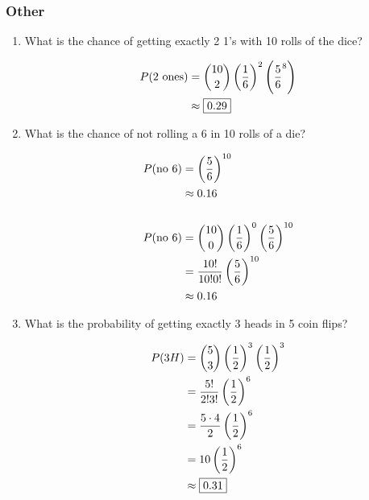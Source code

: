\documentclass[letterpaper, landscape]{exam}
\begin{document}
  \subsubsection{Other}
  \begin{enumerate}
    \item What is the chance of getting exactly 2 1's with 10 rolls of the dice?

      \begin{solution}
        \begin{align*}
        P(\text{2 ones}) & = \binom{10}{2} \del{ \frac{1}{6} }^2 
            \left( \frac{5}{6}^8 \right) \\
                         & \approx \boxed{ 0.29 } \\
        \end{align*}

      \end{solution}

    \item What is the chance of not rolling a 6 in 10 rolls of a die?

      \begin{solution}
        \begin{align*}
          P( \text{no 6} ) & = \del{ \frac{5}{6} }^{10} \\
                           & \approx 0.16 \\
          \\
          P( \text{no 6} ) & = \binom{10}{0} \del{ \frac{1}{6} }^0 \del{ \frac{5}{6} }^{10} \\
                           & = \frac{10!}{10! 0!} \del{ \frac{5}{6} }^{10} \\
                           & \approx 0.16 \\
        \end{align*}
      \end{solution}

    \item What is the probability of getting exactly 3 heads in 5 coin flips?
      \begin{solution}
        \begin{align*}
          P( 3H ) & = \binom{5}{3} \del{ \frac{1}{2} }^3 \del{ \frac{1}{2} }^3 \\
                           & = \frac{5!}{2! 3!} \del{ \frac{1}{2} }^6 \\
                           & = \frac{5 \cdot 4}{2} \del{ \frac{1}{2} }^6 \\
                           & = 10 \del{ \frac{1}{2} }^6 \\
                           & \approx \boxed{ 0.31 } \\
        \end{align*}
      \end{solution}


\end{enumerate}
\end{document}
